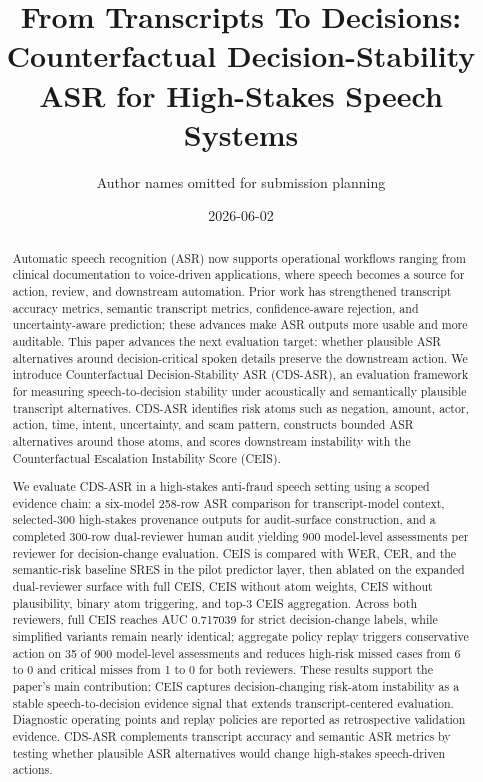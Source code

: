 \documentclass[11pt]{article}
\title{From Transcripts To Decisions: Counterfactual Decision-Stability ASR for High-Stakes Speech Systems}
\author{Author names omitted for submission planning}
\date{2026-06-02}
\begin{document}
\sloppy
\maketitle

\begin{abstract}
Automatic speech recognition (ASR) now supports operational workflows ranging from clinical documentation to voice-driven applications, where speech becomes a source for action, review, and downstream automation. Prior work has strengthened transcript accuracy metrics, semantic transcript metrics, confidence-aware rejection, and uncertainty-aware prediction; these advances make ASR outputs more usable and more auditable. This paper advances the next evaluation target: whether plausible ASR alternatives around decision-critical spoken details preserve the downstream action. We introduce Counterfactual Decision-Stability ASR (CDS-ASR), an evaluation framework for measuring speech-to-decision stability under acoustically and semantically plausible transcript alternatives. CDS-ASR identifies risk atoms such as negation, amount, actor, action, time, intent, uncertainty, and scam pattern, constructs bounded ASR alternatives around those atoms, and scores downstream instability with the Counterfactual Escalation Instability Score (CEIS).

We evaluate CDS-ASR in a high-stakes anti-fraud speech setting using a scoped evidence chain: a six-model 258-row ASR comparison for transcript-model context, selected-300 high-stakes provenance outputs for audit-surface construction, and a completed 300-row dual-reviewer human audit yielding 900 model-level assessments per reviewer for decision-change evaluation. CEIS is compared with WER, CER, and the semantic-risk baseline SRES in the pilot predictor layer, then ablated on the expanded dual-reviewer surface with full CEIS, CEIS without atom weights, CEIS without plausibility, binary atom triggering, and top-3 CEIS aggregation. Across both reviewers, full CEIS reaches AUC 0.717039 for strict decision-change labels, while simplified variants remain nearly identical; aggregate policy replay triggers conservative action on 35 of 900 model-level assessments and reduces high-risk missed cases from 6 to 0 and critical misses from 1 to 0 for both reviewers. These results support the paper's main contribution: CEIS captures decision-changing risk-atom instability as a stable speech-to-decision evidence signal that extends transcript-centered evaluation. Diagnostic operating points and replay policies are reported as retrospective validation evidence. CDS-ASR complements transcript accuracy and semantic ASR metrics by testing whether plausible ASR alternatives would change high-stakes speech-driven actions.
\end{abstract}
\end{document}
